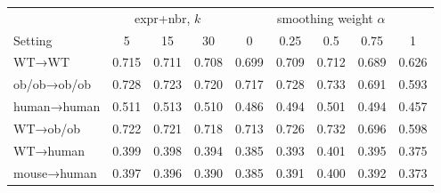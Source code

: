 \begin{tabular}{lccc|ccccc}
\toprule
 & \multicolumn{3}{c|}{expr+nbr, $k$} & \multicolumn{5}{c}{smoothing weight $\alpha$} \\
Setting & 5 & 15 & 30 & 0 & 0.25 & 0.5 & 0.75 & 1 \\
\midrule
WT→WT & 0.715 & 0.711 & 0.708 & 0.699 & 0.709 & 0.712 & 0.689 & 0.626 \\
ob/ob→ob/ob & 0.728 & 0.723 & 0.720 & 0.717 & 0.728 & 0.733 & 0.691 & 0.593 \\
human→human & 0.511 & 0.513 & 0.510 & 0.486 & 0.494 & 0.501 & 0.494 & 0.457 \\
WT→ob/ob & 0.722 & 0.721 & 0.718 & 0.713 & 0.726 & 0.732 & 0.696 & 0.598 \\
WT→human & 0.399 & 0.398 & 0.394 & 0.385 & 0.393 & 0.401 & 0.395 & 0.375 \\
mouse→human & 0.397 & 0.396 & 0.390 & 0.385 & 0.391 & 0.400 & 0.392 & 0.373 \\
\bottomrule
\end{tabular}
